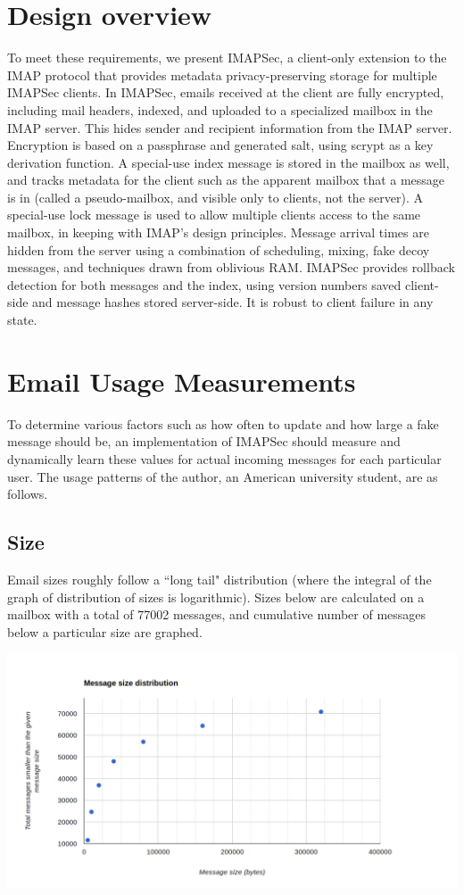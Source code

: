 \documentclass[pageno]{jpaper}
\newcommand{\project}{IMAPSec }
\newcommand{\projectnospace}{IMAPSec}
\begin{document}
\section{Design overview}
To meet these requirements, we present \projectnospace, a client-only extension to the IMAP protocol that provides metadata privacy-preserving storage for multiple \project clients. In \projectnospace, emails received at the client are fully encrypted, including mail headers, indexed, and uploaded to a specialized mailbox in the IMAP server. This hides sender and recipient information from the IMAP server. Encryption is based on a passphrase and generated salt, using scrypt as a key derivation function. A special-use index message is stored in the mailbox as well, and tracks metadata for the client such as the apparent mailbox that a message is in (called a pseudo-mailbox, and visible only to clients, not the server). A special-use lock message is used to allow multiple clients access to the same mailbox, in keeping with IMAP's design principles. Message arrival times are hidden from the server using a combination of scheduling, mixing, fake decoy messages, and techniques drawn from oblivious RAM. \project provides rollback detection for both messages and the index, using version numbers saved client-side and message hashes stored server-side. It is robust to client failure in any state.

\section{Email Usage Measurements}
To determine various factors such as how often to update and how large a fake message should be, an implementation of \project should measure and dynamically learn these values for actual incoming messages for each particular user. The usage patterns of the author, an American university student, are as follows.

\subsection{Size}

Email sizes roughly follow a ``long tail" distribution (where the integral of the graph of distribution of sizes is logarithmic). Sizes below are calculated on a mailbox with a total of 77002 messages, and cumulative number of messages below a particular size are graphed.

\includegraphics[width=\textwidth]{message-size-dist}
\end{document}
